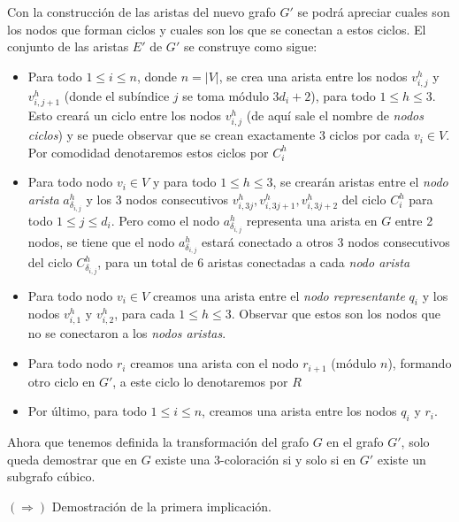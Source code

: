 \documentclass{article}
\begin{document}
Con la construcción de las aristas del nuevo grafo $G'$ se podrá apreciar cuales son los nodos que forman ciclos y cuales
son los que se conectan a estos ciclos. El conjunto de las aristas $E'$ de $G'$ se construye como sigue:
\begin{itemize}
    \item Para todo $1\leq i\leq n$, donde $n=|V|$, se crea una arista entre los nodos $v_{i,j}^h$ y $v_{i,j+1}^h$ (donde el subíndice $j$ se toma módulo $3d_i + 2$), para todo $1\leq h\leq 3$. Esto creará un ciclo entre los nodos $v_{i,j}^h$ (de aquí sale el nombre de \textit{nodos ciclos}) y se puede observar que se crean exactamente 3 ciclos por cada $v_i\in V$. Por comodidad denotaremos estos ciclos por $C_i^h $
    \item Para todo nodo $v_i\in V$ y para todo $1\leq h\leq 3$, se crearán aristas entre el \textit{nodo arista} $a_{\delta_{i,j}}^h$ y los 3 nodos consecutivos $v_{i,3j}^h, v_{i,3j+1}^h, v_{i,3j+2}^h$ del ciclo $C_i^h$ para todo $1\leq j \leq d_i$. Pero como el nodo $a_{\delta_{i,j}}^h$ representa una arista en $G$ entre 2 nodos, se tiene que el nodo $a_{\delta_{i,j}}^h$ estará conectado a otros 3 nodos consecutivos del ciclo $C_{\delta_{i,j}}^h$, para un total de 6 aristas conectadas a cada \textit{nodo arista}
    \item Para todo nodo $v_i\in V$ creamos una arista entre el \textit{nodo representante} $q_i$ y los nodos $v_{i,1}^h$ y $v_{i,2}^h$, para cada $1\leq h\leq 3$. Observar que estos son los nodos que no se conectaron a los \textit{nodos aristas}.
    \item Para todo nodo $r_i$ creamos una arista con el nodo $r_{i+1}$ (módulo $n$), formando otro ciclo en $G'$, a este ciclo lo denotaremos por $R$
    \item Por último, para todo $1\leq i\leq n$, creamos una arista entre los nodos $q_i$ y $r_i$.
\end{itemize}

Ahora que tenemos definida la transformación del grafo $G$ en el grafo $G'$, solo queda demostrar que en $G$ existe una 3-coloración si y solo si en $G'$ existe un subgrafo cúbico.
\newline

$(\Rightarrow)$ Demostración de la primera implicación.
\end{document}
